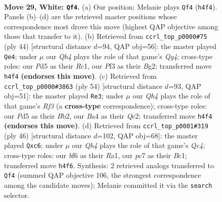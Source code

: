\documentclass[11pt]{article}
\begin{document}
\clearpage

\begin{figure}[p]\centering
\begin{subfigure}{0.46\textwidth}\centering
\resizebox{\linewidth}{!}{%
\newchessgame
\chessboard[
  setfen={r1b5/ppp2ppk/3n1b1p/3P4/B6Q/3q1P1P/PP4P1/R1B3K1 w - - 4 29},
  showmover=false,
  pgfstyle=straightmove, color=movearrow, markmove={h4-f4}
]}
\caption{}
\end{subfigure}\hfill
\begin{subfigure}{0.46\textwidth}\centering
\resizebox{\linewidth}{!}{%
\newchessgame
\chessboard[
  setfen={4r1k1/1p3pp1/p2b1q2/1b5p/1P1B2Q1/P5P1/5PBP/2R3K1 w - - 0 23},
  showmover=false,
  pgfstyle=straightmove, color=movearrow, markmove={g4-e4}
]}
\caption{}
\end{subfigure}
\\[4pt]
\begin{subfigure}{0.46\textwidth}\centering
\resizebox{\linewidth}{!}{%
\newchessgame
\chessboard[
  setfen={4nk2/2p2pp1/p2b2r1/Pp1P3p/6qP/1B3RP1/1BQ2PK1/8 w - - 1 28},
  showmover=false,
  pgfstyle=straightmove, color=movearrow, markmove={f3-e3}
]}
\caption{}
\end{subfigure}\hfill
\begin{subfigure}{0.46\textwidth}\centering
\resizebox{\linewidth}{!}{%
\newchessgame
\chessboard[
  setfen={1r4k1/2p3p1/p1n1p2p/b3p3/2Q1P3/2P2P1q/5P2/R1B1R1K1 w - - 0 24},
  showmover=false,
  pgfstyle=straightmove, color=movearrow, markmove={c4-c6}
]}
\caption{}
\end{subfigure}
\caption{\textbf{Move 29, White: \texttt{Qf4}.} (a) Our position; Melanie plays \texttt{Qf4} (\texttt{h4f4}). Panels (b)--(d) are the retrieved master positions whose correspondence most drove this move (highest QAP objective among those that transfer to it). (b) Retrieved from \texttt{ccrl\_top\_p0000\#75} (ply 44) [structural distance $d$=94, QAP obj=56]: the master played \texttt{Qe4}; under $\mu$ our \emph{Qh4} plays the role of that game's \emph{Qg4}; cross-type roles: our \emph{P}d5 as their \emph{R}c1, our \emph{P}f3 as their \emph{B}g2; transferred move \texttt{h4f4} \textbf{(endorses this move)}. (c) Retrieved from \texttt{ccrl\_top\_p0000\#3863} (ply 54) [structural distance $d$=93, QAP obj=51]: the master played \texttt{Re3}; under $\mu$ our \emph{Qh4} plays the role of that game's \emph{Rf3} (a \textbf{cross-type} correspondence); cross-type roles: our \emph{P}d5 as their \emph{B}b2, our \emph{B}a4 as their \emph{Q}c2; transferred move \texttt{h4f4} \textbf{(endorses this move)}. (d) Retrieved from \texttt{ccrl\_top\_p0001\#319} (ply 46) [structural distance $d$=102, QAP obj=68]: the master played \texttt{Qxc6}; under $\mu$ our \emph{Qh4} plays the role of that game's \emph{Qc4}; cross-type roles: our \emph{b}f6 as their \emph{R}a1, our \emph{p}c7 as their \emph{B}c1; transferred move \texttt{h4f6}. Synthesis: 2 retrieved analogs transferred to \texttt{Qf4} (summed QAP objective 106, the strongest correspondence among the candidate moves); Melanie committed it via the \texttt{search} selector.}
\label{fig:thought-m56}
\end{figure}
\end{document}
